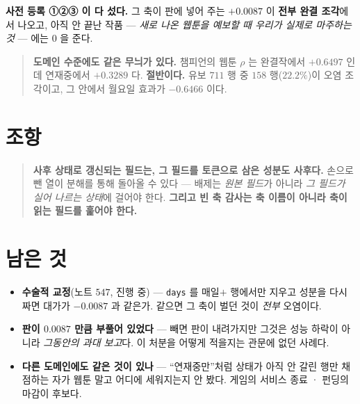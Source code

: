 \documentclass[11pt]{article}
\begin{document}
\textbf{사전 등록 ①②③ 이 다 섰다.} 그 축이 판에 넣어 주는 $+0.0087$ 이
\textbf{전부 완결 조각}에서 나오고, 아직 안 끝난 작품 --- \emph{새로 나온
웹툰을 예보할 때 우리가 실제로 마주하는 것} --- 에는 $0$ 을 준다.

\begin{quote}
\textbf{도메인 수준에도 같은 무늬가 있다.} 챔피언의 웹툰 $\rho$ 는 완결작에서
$+0.6497$ 인데 연재중에서 $+0.3289$ 다. \textbf{절반이다.} 유보 $711$ 행 중
$158$ 행($22.2\%$)이 오염 조각이고, 그 안에서 월요일 효과가 $-0.6466$ 이다.
\end{quote}

\section*{조항}

\begin{quote}
\textbf{사후 상태로 갱신되는 필드는, 그 필드를 토큰으로 삼은 성분도
사후다.} 손으로 뺀 열이 분해를 통해 돌아올 수 있다 --- 배제는 \emph{원본
필드}가 아니라 \emph{그 필드가 실어 나르는 상태}에 걸어야 한다.
\textbf{그리고 빈 축 감사는 축 이름이 아니라 축이 읽는 필드를 훑어야 한다.}
\end{quote}

\section*{남은 것}

\begin{itemize}
\item \textbf{수술적 교정}(노트 $547$, 진행 중) --- \texttt{days} 를 매일$+$
행에서만 지우고 성분을 다시 짜면 대가가 $-0.0087$ 과 같은가. 같으면 그
축이 벌던 것이 \emph{전부} 오염이다.
\item \textbf{판이 $0.0087$ 만큼 부풀어 있었다} --- 빼면 판이 내려가지만
그것은 성능 하락이 아니라 \emph{그동안의 과대 보고}다. 이 처분을 어떻게
적을지는 관문에 없던 사례다.
\item \textbf{다른 도메인에도 같은 것이 있나} --- ``연재중만''처럼 상태가
아직 안 갈린 행만 채점하는 자가 웹툰 말고 어디에 세워지는지 안 봤다.
게임의 서비스 종료 · 펀딩의 마감이 후보다.
\end{itemize}
\end{document}
